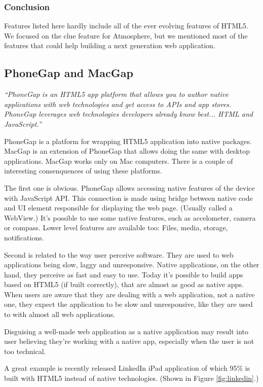 \subsubsection{Conclusion}

Features listed here hardly include all of the ever evolving features of HTML5. We focused on the clue feature for Atmosphere, but we mentioned most of the features that could help building a next generation web application.

\subsection{PhoneGap and MacGap}

\emph{``PhoneGap is an HTML5 app platform that allows you to author native applications with web technologies and get access to APIs and app stores. PhoneGap leverages web technologies developers already know best... HTML and JavaScript.''} \citep{phonegap}

PhoneGap is a platform for wrapping HTML5 application into native packages. MacGap is an extension of PhoneGap that allows doing the same with desktop applications. MacGap works only on Mac computers.  There is a couple of interesting consenquences of using these platforms.

The first one is obvious. PhoneGap allows accessing native features of the device with JavaScript API. This connection is made using bridge between native code and UI element responsible for displaying the web page. (Usually called a WebView.) It’s possible to use some native features, such as accelometer, camera or compass. Lower level features are available too: Files, media, storage, notifications. 

Second is related to the way user perceive software. They are used to web applications being slow, laggy and unresponsive. Native applications, on the other hand, they perceive as fast and easy to use. Today it’s possible to build apps based on HTML5 (if built correctly), that are almost as good as native apps. When users are aware that they are dealing with a web application, not a native one, they expect the application to be slow and unresponsive, like they are used to with almost all web applications. 

Disguising a well-made web application as a native application may result into user believing they’re working with a native app, especially when the user is not too technical.

A great example is recently released LinkedIn iPad application of which 95\% is built with HTML5 instead of native technologies. (Shown in Figure \ref{fig:linkedin}.) \citep{linkedin_ipad}

